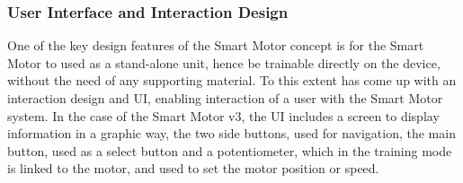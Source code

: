 \subsubsection{\label{sec:methods_sm_ui}User Interface and Interaction Design}

One of the key design features of the Smart Motor concept is for the Smart Motor to used as a stand-alone unit, hence be trainable directly on the device, without the need of any supporting material. To this extent \citet[]{dahal_designing_2024} has come up with an interaction design and UI, enabling interaction of a user with the Smart Motor system. In the case of the Smart Motor v3, the UI includes a screen to display information in a graphic way, the two side buttons, used for navigation, the main button, used as a select button and a potentiometer, which in the training mode is linked to the motor, and used to set the motor position or speed.

